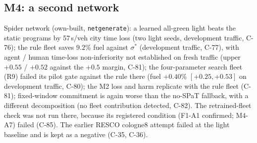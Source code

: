 \documentclass[11pt]{article}
\begin{document}
\begin{table}[t]\centering\small
\caption{Wave 6 on the third grid4 panel (760--779; t4--t8 $\times$ four fleets $\times$ 20) and spider attempt 3. Agent fuel (\%) and time
losses (s/veh) against R, with one-sided 95\% upper bounds in parentheses (98.75\% for spider attempt 3). ``Meets'' means all M3 limits,
including teleports and unfinished trips.}\label{tab:w6}
\end{table}

\subsection{M4: a second network}\label{sec:m4}
Spider network (own-built, \texttt{netgenerate}): a learned all-green light beats the static programs by 57\,s/veh city time loss (two light seeds, development
traffic, C-76); the rule fleet saves $9.2\%$ fuel against $\sigma^*$ (development traffic, C-77), with agent / human time-loss non-inferiority not established on fresh traffic
(upper $+0.55$ / $+0.52$ against the $+0.5$ margin, C-81);
the four-parameter search fleet (R9) failed its pilot gate against the rule there (fuel $+0.40\%$ $[+0.25,+0.53]$ on development
traffic, C-80); the M2 loss and harm replicate with the rule fleet (C-81); fixed-window commitment is again worse than the
no-SPaT fallback, with a different decomposition (no fleet contribution detected, C-82). The retrained-fleet check was not run there, because its registered condition (F1-A1 confirmed; M4-A7) failed (C-85). The
earlier RESCO cologne8 attempt failed at the light baseline and is kept as a negative (C-35, C-36).
\end{document}
